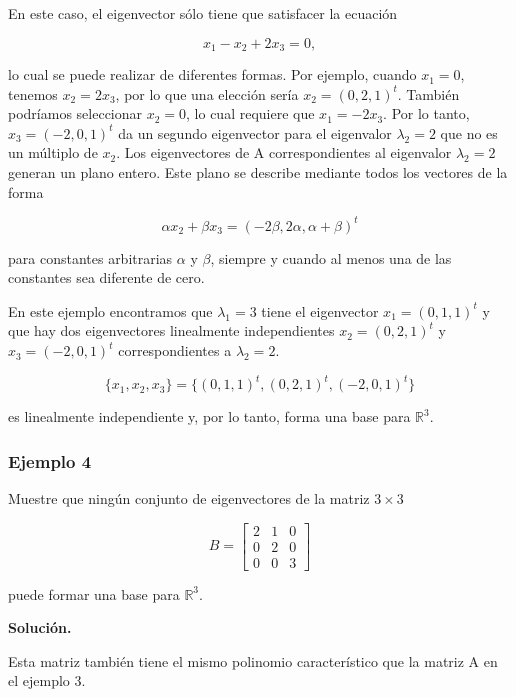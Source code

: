 \documentclass[12pt, a4paper]{article}
\numberwithin{subsection}{section} %
\begin{document}
            En este caso, el eigenvector sólo tiene que satisfacer la ecuación
        
            $$x_1 - x_2 + 2x_3 = 0,$$
        
            lo cual se puede realizar de diferentes formas. Por ejemplo, cuando $x_1 = 0$, tenemos $x_2 = 2x_3$, por lo que una elección sería $x_2 = (0, 2, 1)^t$. También podríamos seleccionar $x_2 = 0$, lo cual requiere que $x_1 = -2x_3$. Por lo tanto, $x_3 = (-2, 0, 1)^t$ da un segundo eigenvector para el eigenvalor $\lambda_2 = 2$ que no es un múltiplo de $x_2$. Los eigenvectores de A correspondientes al eigenvalor $\lambda_2 = 2$ generan un plano entero. Este plano se describe mediante todos los vectores de la forma
        
            $$\alpha x_2 + βx_3 = (-2\beta, 2\alpha , \alpha  + \beta)^t$$
        
            para constantes arbitrarias $\alpha$ y $\beta$, siempre y cuando al menos una de las constantes sea diferente de cero.
        
            En este ejemplo encontramos que $\lambda_1 = 3$ tiene el eigenvector $x_1 = (0, 1, 1)^t$ y que hay dos eigenvectores linealmente independientes $x_2 = (0, 2, 1)^t$ y $x_3 = (-2, 0, 1)^t$ correspondientes a $\lambda_2 = 2$.
        
            $$\{ x_1, x_2, x_3\} = \{(0, 1, 1)^t, (0, 2, 1)^t, (-2, 0, 1)^t \}$$
        
            es linealmente independiente y, por lo tanto, forma una base para $\mathbb{R}^3$.
        
        \subsubsection*{Ejemplo 4}
        
            Muestre que ningún conjunto de eigenvectores de la matriz $3 \times 3$
        
            $$B = \begin{bmatrix}
                2 & 1 & 0 \\
                0 & 2 & 0 \\
                0 & 0 & 3
            \end{bmatrix}$$
        
            puede formar una base para $\mathbb{R}^3$.
        
            {\bf Solución.}
        
            Esta matriz también tiene el mismo polinomio característico que la matriz A en el ejemplo 3.
        
\end{document}
